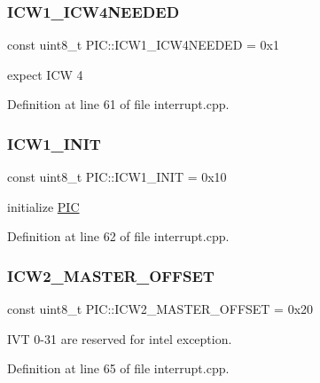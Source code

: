 \subsubsection{\texorpdfstring{I\+C\+W1\+\_\+\+I\+C\+W4\+N\+E\+E\+D\+ED}{ICW1\_ICW4NEEDED}}
{\footnotesize\ttfamily const uint8\+\_\+t P\+I\+C\+::\+I\+C\+W1\+\_\+\+I\+C\+W4\+N\+E\+E\+D\+ED = 0x1}



expect I\+CW 4 



Definition at line 61 of file interrupt.\+cpp.

\mbox{\label{namespace_p_i_c_a8bb2fc0a772eabbbf6adb002f578290e}} 
\subsubsection{\texorpdfstring{I\+C\+W1\+\_\+\+I\+N\+IT}{ICW1\_INIT}}
{\footnotesize\ttfamily const uint8\+\_\+t P\+I\+C\+::\+I\+C\+W1\+\_\+\+I\+N\+IT = 0x10}



initialize \hyperlink{namespace_p_i_c}{P\+IC} 



Definition at line 62 of file interrupt.\+cpp.

\mbox{\label{namespace_p_i_c_a4eada3349fe4b6740074b1adecdb080b}} 
\subsubsection{\texorpdfstring{I\+C\+W2\+\_\+\+M\+A\+S\+T\+E\+R\+\_\+\+O\+F\+F\+S\+ET}{ICW2\_MASTER\_OFFSET}}
{\footnotesize\ttfamily const uint8\+\_\+t P\+I\+C\+::\+I\+C\+W2\+\_\+\+M\+A\+S\+T\+E\+R\+\_\+\+O\+F\+F\+S\+ET = 0x20}



I\+VT 0-\/31 are reserved for intel exception. 



Definition at line 65 of file interrupt.\+cpp.

